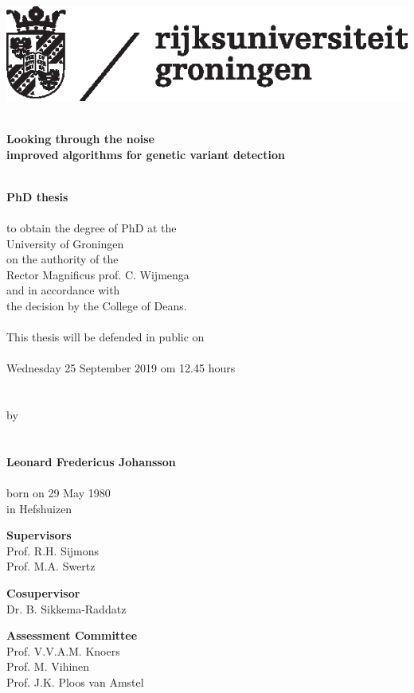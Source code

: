 \begin{flushleft}
\includegraphics[scale=0.8]{img/rugr_logonl_zwart_cmyk}
\end{flushleft}

\begin{center}
\linespread{1.00} %
~\\
\huge
\textbf{Looking through the noise \\ improved algorithms for genetic variant detection}
\\~\\
\linespread{1.05} %


\large
\textbf{PhD thesis}
\\~\\
\normalsize
to obtain the degree of PhD at the\\
University of Groningen\\
on the authority of the\\
Rector Magnificus prof. C. Wijmenga\\
and in accordance with \\
the decision by the College of Deans.
\\~\\
This thesis will be defended in public on
\\~\\
Wednesday 25 September 2019 om 12.45 hours 
\\~\\~\\
by
\\~\\~\\
\large
\textbf{Leonard Fredericus Johansson}
\\~\\
\normalsize
born on 29 May 1980\\
in Hefshuizen\\
\normalsize
\end{center}

\clearpage

\noindent
\textbf{Supervisors}\\
Prof. R.H. Sijmons \\
Prof. M.A. Swertz

\noindent
\textbf{Cosupervisor}\\
Dr. B. Sikkema-Raddatz

\noindent
\textbf{Assessment Committee}\\
Prof. V.V.A.M. Knoers\\
Prof. M. Vihinen\\
Prof. J.K. Ploos van Amstel\\